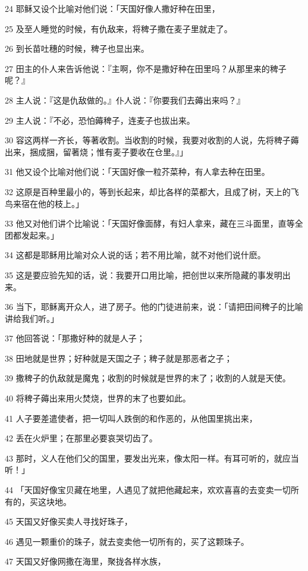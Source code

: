 \par 24 耶稣又设个比喻对他们说：「天国好像人撒好种在田里，
\par 25 及至人睡觉的时候，有仇敌来，将稗子撒在麦子里就走了。
\par 26 到长苗吐穗的时候，稗子也显出来。
\par 27 田主的仆人来告诉他说：『主啊，你不是撒好种在田里吗？从那里来的稗子呢？』
\par 28 主人说：『这是仇敌做的。』仆人说：『你要我们去薅出来吗？』
\par 29 主人说：『不必，恐怕薅稗子，连麦子也拔出来。
\par 30 容这两样一齐长，等著收割。当收割的时候，我要对收割的人说，先将稗子薅出来，捆成捆，留著烧；惟有麦子要收在仓里。』」
\par 31 他又设个比喻对他们说：「天国好像一粒芥菜种，有人拿去种在田里。
\par 32 这原是百种里最小的，等到长起来，却比各样的菜都大，且成了树，天上的飞鸟来宿在他的枝上。」
\par 33 他又对他们讲个比喻说：「天国好像面酵，有妇人拿来，藏在三斗面里，直等全团都发起来。」
\par 34 这都是耶稣用比喻对众人说的话；若不用比喻，就不对他们说什麽。
\par 35 这是要应验先知的话，说：我要开口用比喻，把创世以来所隐藏的事发明出来。
\par 36 当下，耶稣离开众人，进了房子。他的门徒进前来，说：「请把田间稗子的比喻讲给我们听。」
\par 37 他回答说：「那撒好种的就是人子；
\par 38 田地就是世界；好种就是天国之子；稗子就是那恶者之子；
\par 39 撒稗子的仇敌就是魔鬼；收割的时候就是世界的末了；收割的人就是天使。
\par 40 将稗子薅出来用火焚烧，世界的末了也要如此。
\par 41 人子要差遣使者，把一切叫人跌倒的和作恶的，从他国里挑出来，
\par 42 丢在火炉里；在那里必要哀哭切齿了。
\par 43 那时，义人在他们父的国里，要发出光来，像太阳一样。有耳可听的，就应当听！」
\par 44 「天国好像宝贝藏在地里，人遇见了就把他藏起来，欢欢喜喜的去变卖一切所有的，买这块地。
\par 45 天国又好像买卖人寻找好珠子，
\par 46 遇见一颗重价的珠子，就去变卖他一切所有的，买了这颗珠子。
\par 47 天国又好像网撒在海里，聚拢各样水族，
